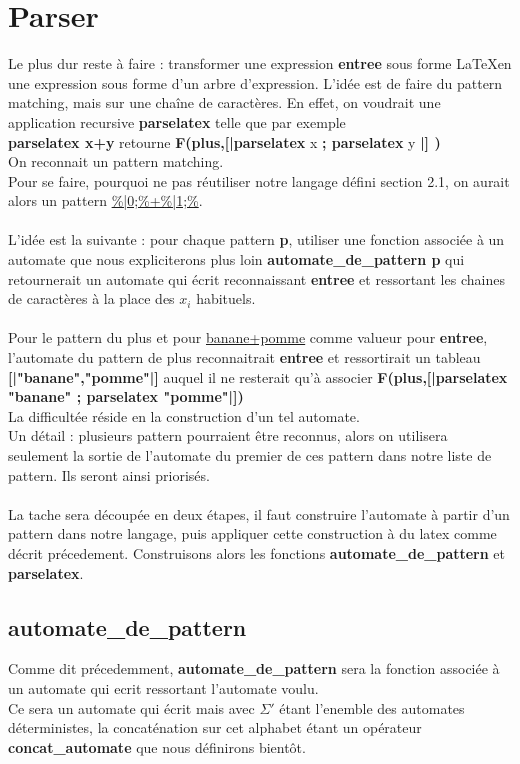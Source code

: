 \documentclass{article}
\theoremstyle{definition}
\begin{document}
\section{Parser}
Le plus dur reste \`a faire : transformer une expression \textbf{entree} sous forme \LaTeX en une expression sous forme d'un arbre d'expression. L'id\'ee est de faire du pattern matching, mais sur une cha\^ine de caract\`eres.
En effet, on voudrait une application recursive \textbf{parselatex} telle que par exemple\\
\textbf{parselatex x+y} retourne \textbf{F(plus,[|parselatex } x \textbf{ ; parselatex} y \textbf{|] )}\\
On reconnait un pattern matching.\\
Pour se faire, pourquoi ne pas r\'eutiliser notre langage d\'efini section 2.1, on aurait alors un pattern \underline{\%|0;\%+\%|1;\%}.\\\\
L'id\'ee est la suivante : pour chaque pattern \textbf{p}, utiliser une fonction associ\'ee \`a un automate que nous expliciterons plus loin \textbf{automate\_de\_pattern p} qui retournerait un automate qui \'ecrit reconnaissant \textbf{entree} et ressortant les chaines de caract\`eres \`a la place des $x_i$ habituels.\\\\ 
Pour le pattern du plus et pour \underline{banane+pomme} comme valueur pour \textbf{entree}, l'automate du pattern de plus reconnaitrait \textbf{entree} et ressortirait un tableau \textbf{[|"banane","pomme"|]} auquel il ne resterait qu'\`a associer \textbf{F(plus,[|parselatex "banane" ; parselatex "pomme"|])}\\
La difficult\'ee r\'eside en la construction d'un tel automate.\\
Un d\'etail : plusieurs pattern pourraient \^etre reconnus, alors on utilisera seulement la sortie de l'automate du premier de ces pattern dans notre liste de pattern. Ils seront ainsi prioris\'es.\\\\

La tache sera d\'ecoup\'ee en deux \'etapes, il faut construire l'automate \`a partir d'un pattern dans notre langage, puis appliquer cette construction \`a du latex comme d\'ecrit pr\'ecedement.
Construisons alors les fonctions \textbf{automate\_de\_pattern} et \textbf{parselatex}.

\subsection{\textbf{automate\_de\_pattern}}
Comme dit pr\'ecedemment, \textbf{automate\_de\_pattern} sera la fonction associ\'ee \`a un automate qui ecrit ressortant l'automate voulu.\\
Ce sera un automate qui \'ecrit mais avec $\Sigma'$ \'etant l'enemble des automates d\'eterministes, la concat\'enation sur cet alphabet \'etant un op\'erateur \textbf{concat\_automate} que nous d\'efinirons bient\^ot.\\
\listoffigures
\end{document}
